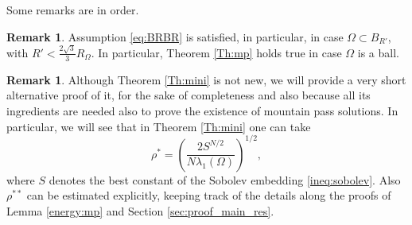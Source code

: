 \documentclass[10pt]{article}
\theoremstyle{definition}
\newtheorem{remark}[proposition]{Remark}
\numberwithin{equation}{section}
\begin{document}
Some remarks are in order.

\begin{remark}\label{rmk:BRR}
Assumption \eqref{eq:BRBR} is satisfied, in particular, in case $\Omega\subset B_{R'}$, with
$R'<\frac{2\sqrt{3}}{3}R_\Omega$. In particular, Theorem \ref{Th:mp} holds true in case $\Omega$ 
is a ball.
\end{remark}

\begin{remark}\label{rmk:constants}
Although Theorem \ref{Th:mini} is not new, we will provide a very short alternative proof of it, 
for the sake of completeness and also because all its ingredients are needed also to prove 
the existence of mountain pass solutions. In particular, we will see that in Theorem \ref{Th:mini} 
one can take 
\begin{equation}\label{eq:rho}
\rho^{*}=\left(\frac{2S^{N/2}}{N\lambda_{1}(\Omega)}\right)^{1/2},
\end{equation}
where $S$ denotes the best constant of the Sobolev embedding 
\eqref{ineq:sobolev}. Also $\rho^{**}$ can be estimated explicitly, keeping track of 
the details along the proofs of Lemma \ref{energy:mp} and Section \ref{sec:proof_main_res}.
\end{remark}
\end{document}
